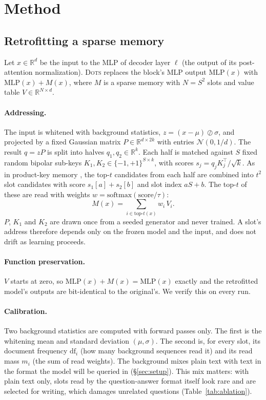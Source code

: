 \documentclass[11pt]{article}
\newcommand{\sys}{\textsc{Dots}}
\begin{document}
\section{Method}

\subsection{Retrofitting a sparse memory}
\label{sec:retrofit}

Let $x \in \mathbb{R}^{d}$ be the input to the MLP of decoder layer $\ell$ (the output of its post-attention normalization). \sys{} replaces the block's MLP output $\mathrm{MLP}(x)$ with $\mathrm{MLP}(x) + M(x)$, where $M$ is a sparse memory with $N = S^2$ slots and value table $V \in \mathbb{R}^{N \times d}$.

\paragraph{Addressing.} The input is whitened with background statistics, $z = (x-\mu)\oslash\sigma$, and projected by a fixed Gaussian matrix $P \in \mathbb{R}^{d\times 2k}$ with entries $\mathcal{N}(0, 1/d)$. The result $q = zP$ is split into halves $q_1, q_2 \in \mathbb{R}^{k}$. Each half is matched against $S$ fixed random bipolar sub-keys $K_1, K_2 \in \{-1,+1\}^{S\times k}$, with scores $s_j = q_j K_j^\top/\sqrt{k}$. As in product-key memory \citep{lample2019pkm}, the top-$t$ candidates from each half are combined into $t^2$ slot candidates with score $s_1[a]+s_2[b]$ and slot index $aS+b$. The top-$t$ of these are read with weights $w = \mathrm{softmax}(\text{score}/\tau)$:
\begin{equation}
M(x) = \sum_{i \in \mathrm{top}\text{-}t(x)} w_i\, V_i .
\end{equation}
$P$, $K_1$ and $K_2$ are drawn once from a seeded generator and never trained. A slot's address therefore depends only on the frozen model and the input, and does not drift as learning proceeds.

\paragraph{Function preservation.} $V$ starts at zero, so $\mathrm{MLP}(x) + M(x) = \mathrm{MLP}(x)$ exactly and the retrofitted model's outputs are bit-identical to the original's. We verify this on every run.

\paragraph{Calibration.} Two background statistics are computed with forward passes only. The first is the whitening mean and standard deviation $(\mu, \sigma)$. The second is, for every slot, its document frequency $\mathrm{df}_i$ (how many background sequences read it) and its read mass $m_i$ (the sum of read weights). The background mixes plain text with text in the format the model will be queried in (\S\ref{sec:setup}). This mix matters: with plain text only, slots read by the question-answer format itself look rare and are selected for writing, which damages unrelated questions (Table~\ref{tab:ablation}).
\end{document}
